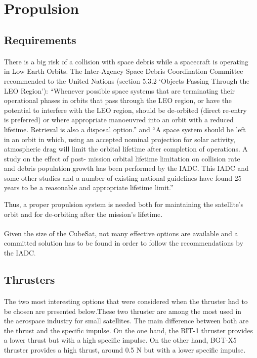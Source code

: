 \section{Propulsion} \label{Appendix:Propulsion}

\subsection{Requirements}

\paragraph{}
There is a big risk of a collision with space debris while a spacecraft is operating in Low Earth Orbits. The Inter-Agency Space Debris Coordination Committee recommended to the United Nations (section 5.3.2 ‘Objects Passing Through the LEO Region’): “Whenever possible space systems that are terminating their operational phases in orbits that pass through the LEO region, or have the potential to interfere with the LEO region, should be de-orbited (direct re-entry is preferred) or where appropriate manoeuvred into an orbit with a reduced lifetime. Retrieval is also a disposal option.” and “A space system should be left in an orbit in which, using an accepted nominal projection for solar activity, atmospheric drag will limit the orbital lifetime after completion of operations. A study on the effect of post- mission orbital lifetime limitation on collision rate and debris population growth has been performed by the IADC. This IADC and some other studies and a number of existing national guidelines have found 25 years to be a reasonable and appropriate lifetime limit.” \cite{collisionLEO}

Thus, a proper propulsion system is needed both for maintaining the satellite's orbit and for de-orbiting after the mission's lifetime.

\paragraph{}
Given the size of the CubeSat, not many effective options are available and a committed solution has to be found in order to follow the recommendations by the IADC.

\subsection{Thrusters}
 
\paragraph{}The two most interesting options that were considered when the thruster had to be chosen are presented below.These two thruster are among the most used in the aerospace industry for small satellites. The main difference between both are the thrust and the specific impulse. On the one hand, the BIT-1 thruster provides a lower thrust but with a high specific impulse. On the other hand, BGT-X5 thruster provides a high thrust, around 0.5 N but with a lower specific impulse.


